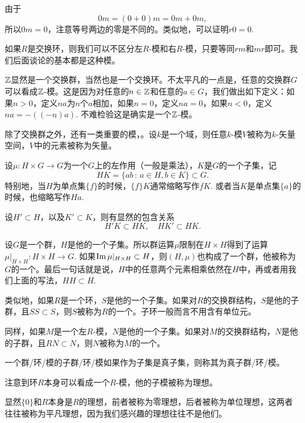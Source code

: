由于
\[
	0m=(0+0)m=0m+0m,
\]
所以$0m=0$，注意等号两边的零是不同的。类似地，可以证明$r0=0$. 

如果$R$是交换环，则我们可以不区分左$R$-模和右$R$-模，只要等同$rm$和$mr$即可。我们后面谈论的基本都是这种模。

\para $\mathbb{Z}$显然是一个交换群，当然也是一个交换环。不太平凡的一点是，任意的交换群$G$可以看成$\mathbb{Z}$-模。这是因为对任意的$n\in \mathbb{Z}$和任意的$a\in G$，我们做出如下定义：如果$n>0$，定义$na$为$n$个$a$相加，如果$n=0$，定义$na=0$，如果$n<0$，定义$na=-((-n)a)$. 不难检验这是确实是一个$\mathbb{Z}$-模。

除了交换群之外，还有一类重要的模，。设$k$是一个域，则任意$k$-模$V$被称为$k$-矢量空间，$V$中的元素被称为矢量。

\para 设$\mu:H\times G\to G$为一个$G$上的左作用（一般是乘法），$K$是$G$的一个子集，记
\[
	HK=\{ab\,:\,a\in H,b\in K\}\subset G.
\]
特别地，当$H$为单点集$\{f\}$的时候，$\{f\}K$通常缩略写作$fK$. 或者当$K$是单点集$\{a\}$的时候，也缩略写作$Ha$.

设$H'\subset H$，以及$K'\subset K$，则有显然的包含关系
\[
	H'K\subset HK,\quad HK'\subset HK.
\]


\para 设$G$是一个群，$H$是他的一个子集。所以群运算$\mu$限制在$H\times H$得到了运算$\mu|_{H\times H}:H\times H\to G$. 如果$\operatorname{Im}\mu|_{H\times H}\subset H$，则$(H,\mu)$也构成了一个群，他被称为$G$的一个。最后一句话就是说，$H$中的任意两个元素相乘依然在$H$中，再或者用我们上面的写法，$HH\subset H$.

类似地，如果$R$是一个环，$S$是他的一个子集。如果对$R$的交换群结构，$S$是他的子群，且$SS\subset S$，则$S$被称为$R$的一个。子环一般而言不用含有单位元。

同样，如果$M$是一个左$R$-模，$N$是他的一个子集。如果对$M$的交换群结构，$N$是他的子群，且$RN\subset N$，则$N$被称为$M$的一个。

一个群/环/模的子群/环/模如果作为子集是真子集，则称其为真子群/环/模。

\para 注意到环$R$本身可以看成一个$R$-模，他的子模被称为理想。

显然$\{0\}$和$R$本身是$R$的理想，前者被称为零理想，后者被称为单位理想，这两者往往被称为平凡理想，因为我们感兴趣的理想往往不是他们。

